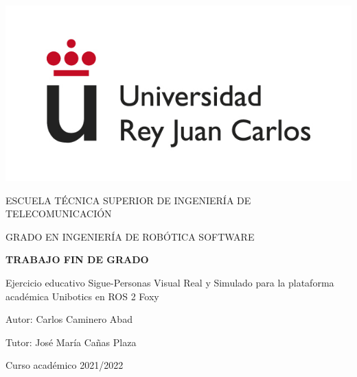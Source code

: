 \begin{titlepage}
	\begin{center}
		\vspace*{3mm}
		\begin{center}
			\includegraphics[width=0.4\linewidth]{imagenes/logo.jpg}
		\end{center}
		\vspace{6.0mm}
		
		\fontsize{15.5}{14}\selectfont ESCUELA TÉCNICA SUPERIOR DE INGENIERÍA DE TELECOMUNICACIÓN
		\vspace{13mm}
		
		\fontsize{14}{14}\selectfont GRADO EN INGENIERÍA DE ROBÓTICA SOFTWARE
		
		\vspace{70pt}
		
		\fontsize{15.7}{14}\selectfont \textbf{TRABAJO FIN DE GRADO} 
		
		\vspace{20mm}
		\begin{LARGE}
			Ejercicio educativo Sigue-Personas Visual Real y Simulado para la plataforma académica Unibotics en ROS 2 Foxy
		\end{LARGE}
		
		\vspace{20mm}
		
		\begin{large}
			Autor: Carlos Caminero Abad
			
			Tutor: José María Cañas Plaza
			
			\vspace{10mm}
		\end{large}
		\begin{normalsize}
			Curso académico 2021/2022		
		\end{normalsize}
		\vspace{10mm}
		
	\end{center}
	
\end{titlepage}